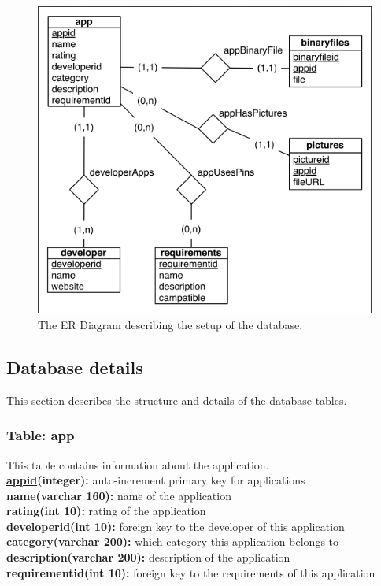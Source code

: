 		\begin{figure}[H]
		\includegraphics[scale=1]{images/ER_Diagram.png}
		\caption[ER Diagram]{The ER Diagram describing the setup of the database.}
		\label{fig:erdiagram}
		\end{figure}

	\subsection{Database details}

		This section describes the structure and details of the database tables.

		\subsubsection{Table: app}

			This table contains information about the application.\\

			{\bf \underline{appid}(integer):} auto-increment primary key for applications  \\
			\textbf{name(varchar 160):} name of the application \\
			\textbf{rating(int 10):} rating of the application \\
			\textbf{developerid(int 10):} foreign key to the developer of this application \\
			\textbf{category(varchar 200):} which category this application belongs to \\
			\textbf{description(varchar 200):} description of the application \\
			\textbf{requirementid(int 10):} foreign key to the requirements of this application \\

